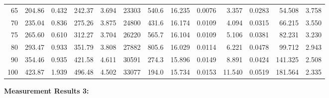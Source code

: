 \documentclass[10pt]{article}
\begin{document}
{\begin{tabular}{|r|rr|rr|rr|rr|rr|r|r|}
       65 &       204.86 &        0.432 &       242.37 &        3.694 &        23303 &        540.6 &       16.235 &       0.0076 &        3.357 &       0.0283 &       54.508 &        3.758 \\
       70 &       235.04 &        0.836 &       275.26 &        3.875 &        24800 &        431.6 &       16.174 &       0.0109 &        4.094 &       0.0315 &       66.215 &        3.550 \\
       75 &       265.60 &        0.610 &       312.27 &        3.704 &        26220 &        565.7 &       16.104 &       0.0109 &        5.106 &       0.0381 &       82.231 &        3.230 \\
       80 &       293.47 &        0.933 &       351.79 &        3.808 &        27882 &        805.6 &       16.029 &       0.0114 &        6.221 &       0.0478 &       99.712 &        2.943 \\
       90 &       354.46 &        0.935 &       421.58 &        4.611 &        30591 &        274.3 &       15.896 &       0.0149 &        8.891 &       0.0424 &      141.325 &        2.508 \\
      100 &       423.87 &        1.939 &       496.48 &        4.502 &        33077 &        194.0 &       15.734 &       0.0153 &       11.540 &       0.0519 &      181.564 &        2.335 \\
\hline
\end{tabular}
}

\vspace{3mm}

\noindent
{\large \bf Measurement Results 3:}
\vspace{3mm}
\end{document}
